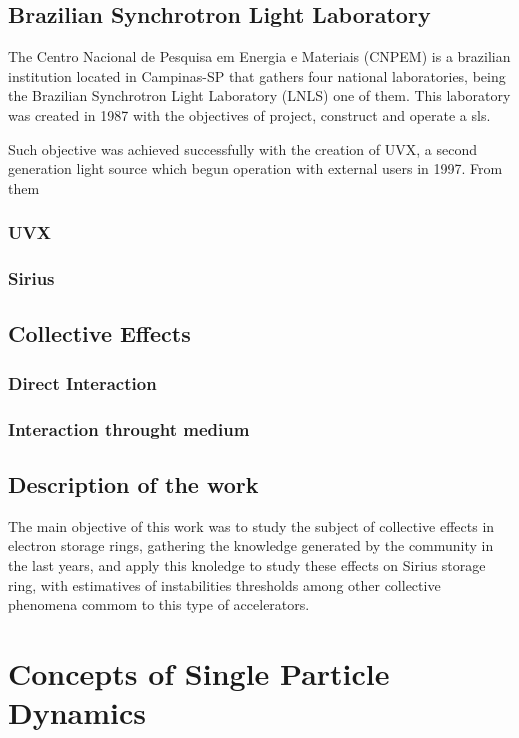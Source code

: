 \section{Brazilian Synchrotron Light Laboratory}

  	The Centro Nacional de Pesquisa em Energia e Materiais (CNPEM) is a brazilian institution located in Campinas-SP that gathers four national laboratories, being the Brazilian Synchrotron Light Laboratory (LNLS) one of them. This laboratory was created in 1987 with the objectives of project, construct and operate a \gls{sls}.

  	Such objective was achieved successfully with the creation of UVX, a second generation light source which begun operation with external users in 1997. From them

\subsection{UVX}
\subsection{Sirius}
\section{Collective Effects}
\subsection{Direct Interaction}
\subsection{Interaction throught medium}
\section{Description of the work}

    The main objective of this work was to study the subject of collective effects in electron storage rings, gathering the knowledge generated by the community in the last years, and apply this knoledge to study these effects on Sirius storage ring, with estimatives of instabilities thresholds among other collective phenomena commom to this type of accelerators.


\chapter{Concepts of Single Particle Dynamics}

